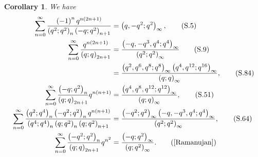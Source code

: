\documentclass[reqno,12pt]{amsart}
\newtheorem{corollary}[theorem]{Corollary}
\theoremstyle{remark}
\numberwithin{equation}{section}
\begin{document}
\begin{corollary}
We have
\begin{align}
\sum_{n=0}^{\infty}\frac{\left(-1\right)^nq^{n\left(2n+1\right)}}
{\left(q^2;q^2\right)_n\left(-q;q^2\right)_{n+1}}
&=\left(q,-q^2;q^2\right)_{\infty}
,\tag{S.5}\label{S.5}\\
\sum_{n=0}^{\infty}\frac{q^{n\left(2n+1\right)}}{\left(q;q\right)_{2n+1}}
&=\frac{\left(-q,-q^3,q^4;q^4\right)_{\infty}}{\left(q^2;q^2\right)_{\infty}}
\tag{S.9}\label{S.9}\\
&=\frac{\left(q^2,q^6,q^8;q^8\right)_{\infty}
\left(q^4,q^{12};q^{16}\right)_{\infty}}{\left(q;q\right)_{\infty}}
,\tag{S.84}\label{S.84}\\
\sum_{n=0}^{\infty}\frac{\left(-q;q^2\right)_n}
{\left(q;q\right)_{2n+1}}q^{n\left(n+1\right)}&=
\frac{\left(q^4,q^8,q^{12};q^{12}\right)_{\infty}}{\left(q;q\right)_{\infty}}, \tag{S.51}\label{S.51}
\\
\sum_{n=0}^{\infty}\frac{\left(q^2;q^4\right)_n\left(-q^2;q^2\right)_n
q^{n\left(n+1\right)}}{\left(q^4;q^4\right)_n\left(q;q^2\right)_n
\left(q;q^2\right)_{n+1}}
&=
\frac{\left(-q^2;q^2\right)_{\infty}\left(-q,-q^3,q^4;q^4\right)_{\infty}}
{\left(q^2;q^2\right)_{\infty}},\tag{S.64}\label{S.64}\\
\sum_{n=0}^{\infty}\frac{\left(-q^2;q^2\right)_n}
{\left(q;q\right)_{2n+1}}q^{n^2}
&=\frac{\left(-q;q^2\right)_{\infty}}{\left(q;q^2\right)_{\infty}}.\tag{\cite[Entry 1.7.13]{Ramanujan}}\label{N1}
\end{align}
\end{corollary}
\end{document}
